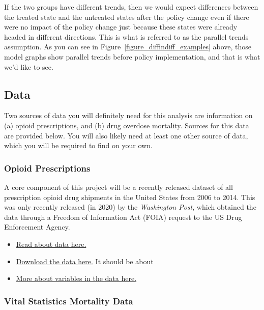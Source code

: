 \documentclass[12pt]{article}
\begin{document}
If the two groups have different trends, then we would expect differences between the treated state and the untreated states after the policy change even if there were no impact of the policy change just because these states were already headed in different directions.  This is what is referred to as the parallel trends assumption. As you can see in Figure~\ref{figure_diffindiff_examples} above, those model graphs show parallel trends before policy implementation, and that is what we'd like to see.



\subsection*{Data}

Two sources of data you will definitely need for this analysis are information on (a) opioid prescriptions, and (b) drug overdose mortality. Sources for this data are provided below. You will also likely need at least one other source of data, which you will be required to find on your own.

\subsubsection*{Opioid Prescriptions}

A core component of this project will be a recently released dataset of all prescription opioid drug shipments in the United States from 2006 to 2014. This was only recently released (in 2020) by the \emph{Washington Post}, which obtained the data through a Freedom of Information Act (FOIA) request to the US Drug Enforcement Agency.

\begin{itemize}
  \item \href{https://github.com/nickeubank/practicaldatascience_book/blob/main/ids720_specific/opioids/MoreThan100billionPainPillsSaturatedTheNationOverNineYears.pdf}{Read about data here.}
  \item \href{https://gfx-data.news-engineering.aws.wapo.pub/ne-static/arcos/v2/bulk/arcos_all.zip}{Download the data here.} It should be about 
  \item \href{https://github.com/wpinvestigative/arcos-api/blob/master/data/data_dictionary.csv}{More about variables in the data here.}
\end{itemize}

\subsubsection*{Vital Statistics Mortality Data}
\end{document}
